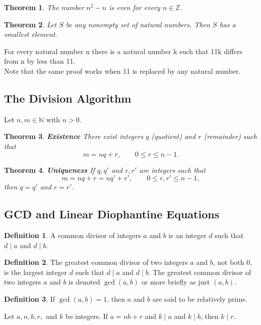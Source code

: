 \documentclass{article}
\newtheorem*{theorem*}{Theorem}
\theoremstyle{definition}
\newtheorem*{definition*}{Definition}
\newenvironment{manualtheorem}[1]{%
  \renewcommand{\thetheorem}{#1}%
  \theorem%
}{%
  \endtheorem%
}
\begin{document}
\begin{theorem*}
	The number $n^2 - n$ is even for every $n \in \mathbb{Z}$.
\end{theorem*}

\begin{theorem*}
	Let $S$ be any nonempty set of natural numbers. Then $S$ has a smallest element.
\end{theorem*}

\begin{manualtheorem}{1.27}
	For every natural number n there is a natural number k such that 11k
	differs from n by less than 11. \\Note that the same proof works when 11 is replaced by any natural number.
\end{manualtheorem}

\subsection{The Division Algorithm}
Let $n, m \in \mathbb{N}$ with $n > 0$.
\begin{theorem*}
	\textbf{Existence}
	There exist integers $q$ (quotient) and $r$ (remainder) such that
	\[
		m = nq + r, \qquad 0 \leq r \leq n - 1.
	\]
\end{theorem*}

\begin{theorem*}
	\textbf{Uniqueness}
	If $q, q'$ and $r, r'$ are integers such that
	\[
		m = nq + r = nq' + r', \qquad 0 \leq r, r' \leq n - 1,
	\]
	then $q = q'$ and $r = r'$.
\end{theorem*}


\subsection{GCD and Linear Diophantine Equations}

\begin{definition*}
	A common divisor of integers $a$ and $b$ is an integer $d$ such that $d \mid a$ and $d \mid b$.
\end{definition*}

\begin{definition*}
	The greatest common divisor of two integers $a$ and $b$, not both $0$, is the largest integer $d$ such that $d \mid a$ and $d \mid b$. The greatest common divisor of two integers $a$ and $b$ is denoted $\gcd(a, b)$ or more briefly as just $(a, b)$.
\end{definition*}

\begin{definition*}
	If $\gcd(a, b) = 1$, then $a$ and $b$ are said to be relatively prime.
\end{definition*}
\begin{manualtheorem}{1.32}
	Let $a, n, b, r,$ and $k$ be integers. If $a = nb + r$ and $k \mid a$ and $k \mid b$,
	then $k \mid r$.
\end{manualtheorem}
\end{document}
